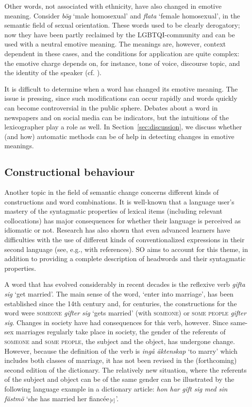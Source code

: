 \documentclass[output=paper]{langscibook}
\begin{document}
Other words, not associated with ethnicity, have also changed in emotive meaning. Consider \emph{bög} `male homosexual' and \emph{flata} `female homosexual', in the semantic field of sexual orientation. These words used to be clearly derogatory; now they have been partly reclaimed by the LGBTQI-community and can be used with a neutral emotive meaning. The meanings are, however, context dependent in these cases, and the conditions for application are quite complex: the emotive charge depends on, for instance, tone of voice, discourse topic, and the identity of the speaker (cf. \citealt{petersson2020}). 

It is difficult to determine when a word has changed its emotive meaning. The issue is pressing, since such modifications can occur rapidly and words quickly can become controversial in the public sphere. Debates about a word in newspapers and on social media can be indicators, but the intuitions of the lexicographer play a role as well. In Section~\ref{sec:discussion}, we discuss whether (and how) automatic methods can be of help in detecting changes in emotive meanings.

\subsection{Constructional behaviour}
Another topic in the field of semantic change concerns different kinds of constructions and word combinations. It is well-known that a language user's mastery of the syntagmatic properties of lexical items (including relevant collocations) has major consequences for whether their language is perceived as idiomatic or not. Research has also shown that even advanced learners have difficulties with the use of different kinds of conventionalized expressions in their second language (see, e.g., \citealt[479]{nation2013} with references). SO aims to account for this theme, in addition to providing a complete description of headwords and their syntagmatic properties. 

A word that has evolved considerably in recent decades is the reflexive verb \emph{gifta sig} `get married'. The main sense of the word, `enter into marriage', has been established since the 14th century and, for centuries, the constructions for the word were \textsc{someone} \emph{gifter sig} `gets married' (with \textsc{someone}) or \textsc{some people} \emph{gifter sig}. Changes in society have had consequences for this verb, however. Since same-sex marriages regularly take place in society, the gender of the referents of \textsc{someone} and \textsc{some people}, the subject and the object, has undergone change. However, because the definition of the verb is \emph{ingå äktenskap} `to marry' which includes both classes of marriage, it has not been revised in the (forthcoming) second edition of the dictionary. The relatively new situation, where the referents of the subject and object can be of the same gender can be illustrated by the following language example in a dictionary article: \textit{hon har gift sig med sin fästmö} `she has married her fiancée$_{\text{[\textsc{f}]}}$'.
\end{document}
